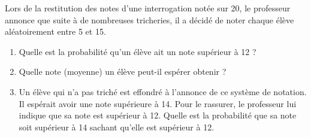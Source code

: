 \begin{exercice_cours}[\quad]{}

	Lors de la restitution des notes d’une interrogation notée sur
20, le professeur annonce que suite à de nombreuses tricheries,
il a décidé de noter chaque élève aléatoirement entre 5
et 15.

\begin{enumerate}
	\item Quelle est la probabilité qu’un élève ait un note supérieur
à 12 ?
	\item Quelle note (moyenne) un élève peut-il espérer obtenir
?
	\item Un élève qui n’a pas triché est effondré à l’annonce de
ce système de notation. Il espérait avoir une note supérieure
à 14. Pour le rassurer, le professeur lui indique
que sa note est supérieur à 12. Quelle est la probabilité
que sa note soit supérieur à 14 sachant qu’elle est supérieur
à 12.
\end{enumerate}
	\end{exercice_cours}

